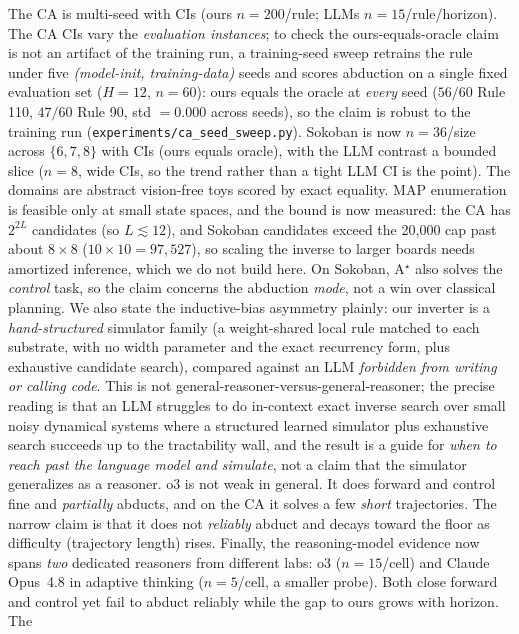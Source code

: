 \documentclass{article}
\begin{document}
The CA is multi-seed with CIs (ours $n=200$/rule; LLMs $n=15$/rule/horizon). The CA CIs vary the
\emph{evaluation instances}; to check the ours-equals-oracle claim is not an artifact of the training
run, a training-seed sweep retrains the rule under five \emph{(model-init, training-data)} seeds and
scores abduction on a single fixed evaluation set ($H{=}12$, $n{=}60$): ours equals the oracle at
\emph{every} seed ($56/60$ Rule 110, $47/60$ Rule 90, std $=0.000$ across seeds), so the claim is
robust to the training run (\texttt{experiments/ca\_seed\_sweep.py}). Sokoban is now
$n=36$/size across $\{6,7,8\}$ with CIs (ours equals oracle), with the LLM contrast a bounded slice
($n=8$, wide CIs, so the trend rather than a tight LLM CI is the point). The domains are abstract
vision-free toys scored by exact equality. MAP enumeration is feasible only at small state spaces,
and the bound is now measured: the CA has $2^{2L}$ candidates (so $L \lesssim 12$), and Sokoban
candidates exceed the 20{,}000 cap past about $8\times8$ ($10\times10 = 97{,}527$), so scaling the
inverse to larger boards needs amortized inference, which we do not build here. On Sokoban, A$^\star$
also solves the \emph{control} task, so the claim concerns the abduction \emph{mode}, not a win over
classical planning. We also state the inductive-bias asymmetry plainly: our inverter is a
\emph{hand-structured} simulator family (a weight-shared local rule matched to each substrate, with no
width parameter and the exact recurrency form, plus exhaustive candidate search), compared against an LLM
\emph{forbidden from writing or calling code}. This is not general-reasoner-versus-general-reasoner;
the precise reading is that an LLM struggles to do in-context exact inverse search over small noisy
dynamical systems where a structured learned simulator plus exhaustive search succeeds up to the
tractability wall, and the result is a guide for \emph{when to reach past the language model and
simulate}, not a claim that the simulator generalizes as a reasoner. o3 is not weak in general. It
does forward and control fine and \emph{partially} abducts, and on the CA it solves a few \emph{short}
trajectories. The narrow claim is that it does not \emph{reliably} abduct and decays toward the floor
as difficulty (trajectory length) rises.
Finally, the reasoning-model evidence now spans \emph{two} dedicated reasoners from different labs: o3
($n=15$/cell) and Claude Opus~4.8 in adaptive thinking ($n=5$/cell, a smaller probe). Both
close forward and control yet fail to abduct reliably while the gap to ours grows with horizon. The
\end{document}
